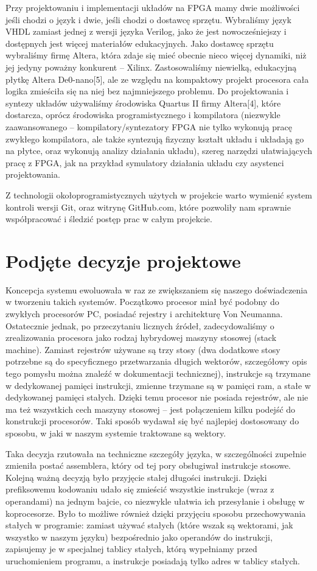 Przy projektowaniu i implementacji układów na FPGA mamy dwie możliwości jeśli chodzi o język i dwie, jeśli chodzi o dostawcę sprzętu. Wybraliśmy język VHDL zamiast jednej z wersji języka Verilog, jako że jest nowocześniejszy i dostępnych jest więcej materiałów edukacyjnych. Jako dostawcę sprzętu wybraliśmy firmę Altera, która zdaje się mieć obecnie nieco więcej dynamiki, niż jej jedyny poważny konkurent -- Xilinx. Zastosowaliśmy niewielką, edukacyjną płytkę Altera De0-nano[5], ale ze względu na kompaktowy projekt procesora cała logika zmieściła się na niej bez najmniejszego problemu. Do projektowania i syntezy układów używaliśmy środowiska Quartus II firmy Altera[4], które dostarcza, oprócz środowiska programistycznego i kompilatora (niezwykle zaawansowanego -- kompilatory/syntezatory FPGA nie tylko wykonują pracę zwykłego kompilatora, ale także syntezują fizyczny kształt układu i układają go na płytce, oraz wykonują analizy działania układu), szereg narzędzi ułatwiających pracę z FPGA, jak na przykład symulatory działania układu czy asystenci projektowania.

Z technologii okołoprogramistycznych użytych w projekcie warto wymienić system kontroli wersji Git, oraz witrynę GitHub.com, które pozwoliły nam sprawnie współpracować i śledzić postęp prac w całym projekcie.

\section{Podjęte decyzje projektowe}
Koncepcja systemu ewoluowała w raz ze zwiększaniem się naszego doświadczenia w tworzeniu takich systemów. Początkowo procesor miał być podobny do zwykłych procesorów PC, posiadać rejestry i architekturę Von Neumanna. Ostatecznie jednak, po przeczytaniu licznych źródeł, zadecydowaliśmy o zrealizowania procesora jako rodzaj hybrydowej maszyny stosowej (stack machine). Zamiast rejestrów używane są trzy stosy (dwa dodatkowe stosy potrzebne są do specyficznego przetwarzania długich wektorów, szczegółowy opis tego pomysłu można znaleźć w dokumentacji technicznej), instrukcje są trzymane w dedykowanej pamięci instrukcji, zmienne trzymane są w pamięci ram, a stałe w dedykowanej pamięci stałych. Dzięki temu procesor nie posiada rejestrów, ale nie ma też wszystkich cech maszyny stosowej -- jest połączeniem kilku podejść do konstrukcji procesorów. Taki sposób wydawał się być najlepiej dostosowany do sposobu, w jaki w naszym systemie traktowane są wektory.

Taka decyzja rzutowała na techniczne szczegóły języka, w szczególności zupełnie zmieniła postać assemblera, który od tej pory obsługiwał instrukcje stosowe. Kolejną ważną decyzją było przyjęcie stałej długości instrukcji. Dzięki prefiksowemu kodowaniu udało się zmieścić wszystkie instrukcje (wraz z operandami) na jednym bajcie, co niezwykle ułatwia ich przesyłanie i obsługę w koprocesorze. Było to możliwe również dzięki przyjęciu sposobu przechowywania stałych w programie: zamiast używać stałych (które wszak są wektorami, jak wszystko w naszym języku) bezpośrednio jako operandów do instrukcji, zapisujemy je w specjalnej tablicy stałych, którą wypełniamy przed uruchomieniem programu, a instrukcje posiadają tylko adres w tablicy stałych.
